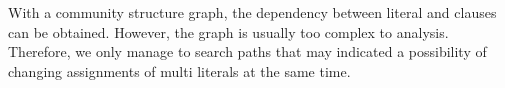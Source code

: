 With a community structure graph, the dependency between literal and clauses can be obtained. However, the graph is usually too complex to analysis. Therefore, we only manage to search paths that may indicated a possibility of changing assignments of multi literals at the same time.




